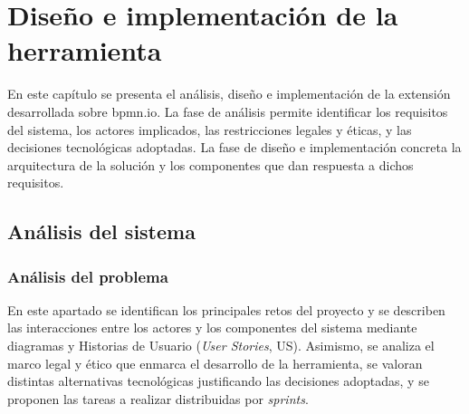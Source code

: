

\chapter{Diseño e implementación de la herramienta}

En este capítulo se presenta el análisis, diseño e implementación de la extensión desarrollada sobre bpmn.io. La fase de análisis permite identificar los requisitos del sistema, los actores implicados, las restricciones legales y éticas, y las decisiones tecnológicas adoptadas. La fase de diseño e implementación concreta la arquitectura de la solución y los componentes que dan respuesta a dichos requisitos.

\section{Análisis del sistema}

\subsection{Análisis del problema}

En este apartado se identifican los principales retos del proyecto y se describen las interacciones entre los actores y los componentes del sistema mediante diagramas y Historias de Usuario (\textit{User Stories}, US). Asimismo, se analiza el marco legal y ético que enmarca el desarrollo de la herramienta, se valoran distintas alternativas tecnológicas justificando las decisiones adoptadas, y se proponen las tareas a realizar distribuidas por \textit{sprints}.


